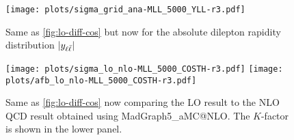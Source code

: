 \begin{figure}[t]
  \centering
  \texttt{[image: plots/sigma\_grid\_ana-MLL\_5000\_YLL-r3.pdf]}
  \caption{Same as \cref{fig:lo-diff-cos} but now for the absolute dilepton rapidity distribution $|y_{\ell\bar{\ell}}|$}
  \label{fig:lo-diff-yll}
\end{figure}
 
\begin{figure}[t]
  \centering
  \texttt{[image: plots/sigma\_lo\_nlo-MLL\_5000\_COSTH-r3.pdf]}
  \texttt{[image: plots/afb\_lo\_nlo-MLL\_5000\_COSTH-r3.pdf]}
  \caption{Same as \cref{fig:lo-diff-cos} now comparing the LO result
    to the NLO QCD result obtained using
    {\sc\small MadGraph5\_aMC@NLO}.
    The $K$-factor is shown in the lower panel.
  }
  \label{fig:lo-kfact}
\end{figure}
